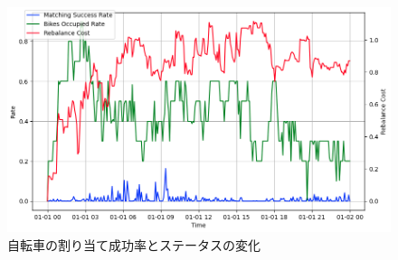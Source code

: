          \begin{figure}[b]
            \centering
            \includegraphics[scale=0.25]
            {figures/dispatchedResultFor1Day.png}
            \caption{自転車の割り当て成功率とステータスの変化}
            \label{fig:自転車の割り当て成功率とステータスの変化}
          \end{figure}

